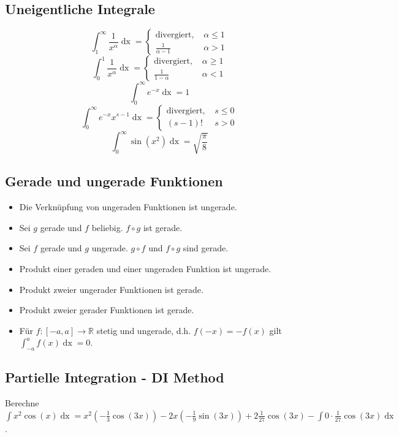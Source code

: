 \documentclass[a4paper,10pt]{article}
\def\dx{\mathop{dx}}
\begin{document}
\subsection{Uneigentliche Integrale}
$$\int_1^\infty \frac{1}{x^\alpha} \dx = \begin{cases}
  \text{divergiert, } & \alpha \leq 1\\
  \frac{1}{\alpha - 1} & \alpha > 1
\end{cases}$$
$$\int_0^1 \frac{1}{x^\alpha} \dx = \begin{cases}
  \text{divergiert, } & \alpha \geq 1\\
  \frac{1}{1- \alpha} & \alpha < 1
\end{cases}$$
$$\int_0^\infty e^{-x} \dx = 1$$
$$\int_0^\infty e^{-x}x^{s-1} \dx = \begin{cases}
  \text{divergiert, } & s \leq 0\\
  (s-1)! & s > 0
\end{cases}$$
$$\int_0^\infty \sin(x^2) \dx = \sqrt{\frac{\pi}{8}}$$

\subsection{Gerade und ungerade Funktionen}
\begin{itemize}
  \item Die Verknüpfung von ungeraden Funktionen ist ungerade. 
  \item Sei $g$ gerade und $f$ beliebig. $f \circ g$ ist gerade.
  \item Sei $f$ gerade und $g$ ungerade. $g \circ f$ und $f \circ g$ sind gerade.
  \item Produkt einer geraden und einer ungeraden Funktion ist ungerade.
  \item Produkt zweier ungerader Funktionen ist gerade.
  \item Produkt zweier gerader Funktionen ist gerade.
  \item Für $f: [-a, a] \to \mathbb{R}$ stetig und ungerade, d.h. $f(-x) = -f(x)$ gilt $\int_{-a}^a f(x) \dx = 0$.
\end{itemize}

\subsection{Partielle Integration - DI Method}
Berechne $\int x^2 \cos(x) \dx = x^2 (-\frac{1}{3}\cos(3x)) - 2x(-\frac{1}{9}\sin(3x)) + 2\frac{1}{27}\cos(3x) - \int 0 \cdot \frac{1}{27} \cos(3x) \dx$.
\end{document}
